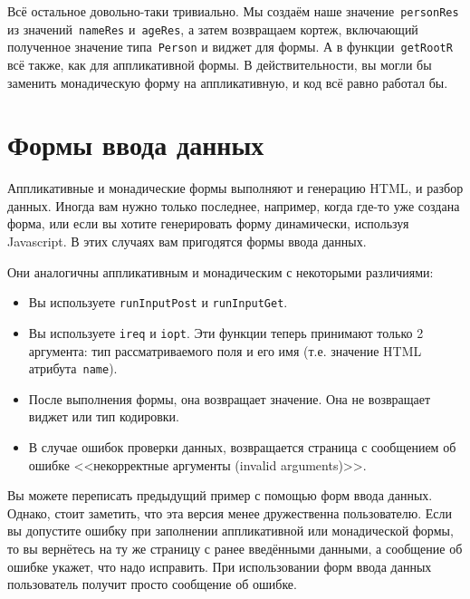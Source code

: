 Всё остальное довольно-таки тривиально. Мы создаём наше
значение~\lstinline'personRes' из значений~\lstinline'nameRes'
и~\lstinline'ageRes', а затем возвращаем кортеж, включающий полученное
значение типа~\lstinline'Person' и виджет для формы. А в
функции~\lstinline'getRootR' всё также, как для аппликативной формы. В
действительности, вы могли бы заменить монадическую форму на
аппликативную, и код всё равно работал бы.

\section{Формы ввода данных}
Аппликативные и монадические формы выполняют и генерацию HTML, и разбор
данных.  Иногда вам нужно только последнее, например, когда где-то уже создана
форма, или если вы хотите генерировать форму динамически, используя
Javascript. В этих случаях вам пригодятся формы ввода данных.

Они аналогичны аппликативным и монадическим с некоторыми различиями:
\begin{itemize}
    \item Вы используете \lstinline'runInputPost' и \lstinline'runInputGet'.
    \item Вы используете \lstinline'ireq' и \lstinline'iopt'. Эти функции
        теперь принимают только 2 аргумента: тип рассматриваемого поля и его
        имя (т.е. значение HTML атрибута~\texttt{name}).
    \item После выполнения формы, она возвращает значение. Она не возвращает
        виджет или тип кодировки.
    \item В случае ошибок проверки данных, возвращается страница с сообщением
        об ошибке <<некорректные аргументы (invalid arguments)>>.
\end{itemize}
Вы можете переписать предыдущий пример с помощью форм ввода данных. Однако,
стоит заметить, что эта версия менее дружественна пользователю. Если вы
допустите ошибку при заполнении аппликативной или монадической формы, то вы
вернётесь на ту же страницу с ранее введёнными данными, а сообщение об ошибке
укажет, что надо исправить. При использовании форм ввода данных пользователь
получит просто сообщение об ошибке.



